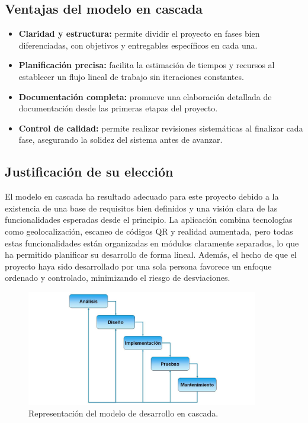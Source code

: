 \subsection*{Ventajas del modelo en cascada}
\begin{itemize}
\item \textbf{Claridad y estructura:} permite dividir el proyecto en fases bien diferenciadas, con objetivos y entregables específicos en cada una.
\item \textbf{Planificación precisa:} facilita la estimación de tiempos y recursos al establecer un flujo lineal de trabajo sin iteraciones constantes.
\item \textbf{Documentación completa:} promueve una elaboración detallada de documentación desde las primeras etapas del proyecto.
\item \textbf{Control de calidad:} permite realizar revisiones sistemáticas al finalizar cada fase, asegurando la solidez del sistema antes de avanzar.
\end{itemize}

\subsection*{Justificación de su elección}
El modelo en cascada ha resultado adecuado para este proyecto debido a la existencia de una base de requisitos bien definidos y una visión clara de las funcionalidades esperadas desde el principio. La aplicación combina tecnologías como geolocalización, escaneo de códigos QR y realidad aumentada, pero todas estas funcionalidades están organizadas en módulos claramente separados, lo que ha permitido planificar su desarrollo de forma lineal. Además, el hecho de que el proyecto haya sido desarrollado por una sola persona favorece un enfoque ordenado y controlado, minimizando el riesgo de desviaciones.

\begin{figure}[H]
\centering
\includegraphics[width=0.9\textwidth]{figs/modelo_cascada.jpg}
\caption{Representación del modelo de desarrollo en cascada.}
\label{fig:modelo-cascada}
\end{figure}



